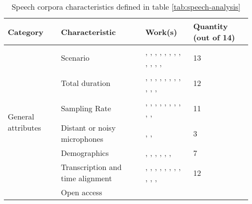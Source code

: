 \begin{landscape}
\centering
\begin{longtable}{|p{4cm}|p{5cm}|p{7cm}|p{3.5cm}|}
    \caption{Speech corpora characteristics defined in table \ref{tab:speech-analysis}}
    \label{tab:results-attributes}\\
    \hline Category & Characteristic & Work(s) & Quantity (out of 14)  \\ \hline
\multirow{7}{*}{General attributes} 
    & Scenario & 
    \cite{almeman2018building}, \cite{dwivedi2017documenting}, \cite{bougrine2017altruistic}, \cite{bougrine2017altruistic}, \cite{moore2017sheffield}, \cite{ramli2017first}, \cite{goldman2016siwis}, \cite{liu2016sheffield}, \cite{ruilan2016improving}, \cite{klessa2013paralingua}, \cite{nagino2008building},  \cite{clopper2006nationwide}, \cite{zhang2008improved} & 13
    \\ \cline{2-4} & Total duration &
    \cite{dwivedi2017documenting}, \cite{bougrine2017altruistic}, \cite{bougrine2017altruistic}, \cite{moore2017sheffield}, \cite{ramli2017first}, \cite{goldman2016siwis}, \cite{liu2016sheffield}, \cite{ruilan2016improving}, \cite{klessa2013paralingua}, \cite{nagino2008building}, \cite{clopper2006nationwide}, \cite{zhang2008improved} & 12
    \\ \cline{2-4} & Sampling Rate &
    \cite{almeman2018building}, \cite{dwivedi2017documenting}, \cite{bougrine2017altruistic}, \cite{ng2017shefce}, \cite{moore2017sheffield}, \cite{ramli2017first}, \cite{goldman2016siwis}, \cite{liu2016sheffield}, \cite{ruilan2016improving}, \cite{klessa2013paralingua}, \cite{clopper2006nationwide} & 11
    \\ \cline{2-4}& Distant or noisy microphones & 
    \cite{moore2017sheffield}, \cite{ramli2017first}, \cite{liu2016sheffield} & 3
    \\ \cline{2-4} & Demographics &
    \cite{dwivedi2017documenting}, \cite{bougrine2017altruistic}, \cite{ng2017shefce}, \cite{goldman2016siwis}, \cite{ruilan2016improving}, \cite{klessa2013paralingua}, \cite{clopper2006nationwide} & 7
    \\ \cline{2-4} & Transcription and time alignment & %
    \cite{dwivedi2017documenting}, \cite{bougrine2017altruistic}, \cite{bougrine2017altruistic}, \cite{ng2017shefce}, \cite{moore2017sheffield}, \cite{ramli2017first}, \cite{goldman2016siwis}, \cite{liu2016sheffield}, \cite{ruilan2016improving}, \cite{klessa2013paralingua}, \cite{nagino2008building}, \cite{clopper2006nationwide} & 12
    \\ \cline{2-4} & Open access &

\end{longtable}
\end{landscape}
